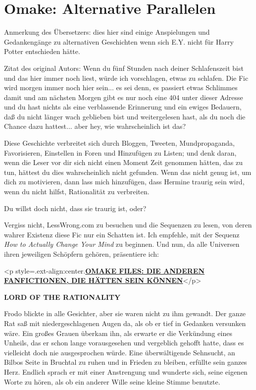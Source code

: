 \chapter{Omake: Alternative Parallelen}

Anmerkung des Übersetzers: dies hier sind einige Anspielungen und Gedankengänge
zu alternativen Geschichten wenn sich E.Y. nicht für Harry Potter entschieden
hätte.

Zitat des original Autors: Wenn du fünf Stunden nach deiner Schlafenszeit bist
und das hier immer noch liest, würde ich vorschlagen, etwas zu schlafen. Die Fic
wird morgen immer noch hier sein... es sei denn, es passiert etwas Schlimmes
damit und am nächsten Morgen gibt es nur noch eine 404 unter dieser Adresse und
du hast nichts als eine verblassende Erinnerung und ein ewiges Bedauern, daß du
nicht länger wach geblieben bist und weitergelesen hast, als du noch die Chance
dazu hattest... aber hey, wie wahrscheinlich ist das?

Diese Geschichte verbreitet sich durch Bloggen, Tweeten, Mundpropaganda,
Favorisieren, Einstellen in Foren und Hinzufügen zu Listen; und denk daran, wenn
die Leser vor dir sich nicht einen Moment Zeit genommen hätten, das zu tun,
hättest du dies wahrscheinlich nicht gefunden. Wenn das nicht genug ist, um dich
zu motivieren, dann lass mich hinzufügen, dass Hermine traurig sein wird, wenn
du nicht hilfst, Rationalität zu verbreiten.

Du willst doch nicht, dass sie traurig ist, oder?

Vergiss nicht, LessWrong.com zu besuchen und die Sequenzen zu lesen, von deren
wahrer Existenz diese Fic nur ein Schatten ist. Ich empfehle, mit der Sequenz
\emph{How to Actually Change Your Mind }zu beginnen. Und nun, da alle Universen
ihren jeweiligen Schöpfern gehören, präsentiere ich:


<p style=\grqq{}.ext-align:center\grqq{}.\textbf{\underline{OMAKE FILES: DIE
ANDEREN FANFICTIONEN, DIE HÄTTEN SEIN KÖNNEN}}</p>


\textbf{LORD OF THE RATIONALITY }

Frodo blickte in alle Gesichter, aber sie waren nicht zu ihm gewandt. Der ganze
Rat saß mit niedergeschlagenen Augen da, als ob er tief in Gedanken versunken
wäre. Ein großes Grauen überkam ihn, als erwarte er die Verkündung eines
Unheils, das er schon lange vorausgesehen und vergeblich gehofft hatte, dass es
vielleicht doch nie ausgesprochen würde. Eine überwältigende Sehnsucht, an
Bilbos Seite in Bruchtal zu ruhen und in Frieden zu bleiben, erfüllte sein
ganzes Herz. Endlich sprach er mit einer Anstrengung und wunderte sich, seine
eigenen Worte zu hören, als ob ein anderer Wille seine kleine Stimme benutzte.

